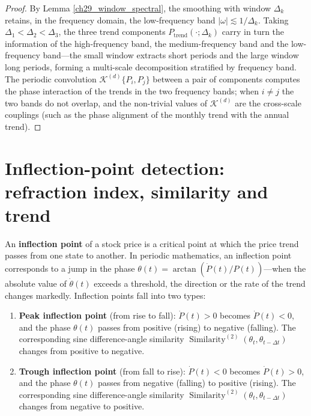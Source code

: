 \begin{proof}
By Lemma \ref{ch29_window_spectral}, the smoothing with window $\Delta_k$ retains, in the frequency domain, the low-frequency band $|\omega| \lesssim 1/\Delta_k$. Taking $\Delta_1 < \Delta_2 < \Delta_3$, the three trend components $P_{\text{trend}}(\cdot;\Delta_k)$ carry in turn the information of the high-frequency band, the medium-frequency band and the low-frequency band---the small window extracts short periods and the large window long periods, forming a multi-scale decomposition stratified by frequency band. The periodic convolution $\mathcal{K}^{(d)}\{P_i, P_j\}$ between a pair of components computes the phase interaction of the trends in the two frequency bands; when $i \neq j$ the two bands do not overlap, and the non-trivial values of $\mathcal{K}^{(d)}$ are the cross-scale couplings (such as the phase alignment of the monthly trend with the annual trend).
\end{proof}

\section{Inflection-point detection: refraction index, similarity and trend}

\begin{definition}\label{def:stock_inflection_point}
An \textbf{inflection point} of a stock price is a critical point at which the price trend passes from one state to another. In periodic mathematics, an inflection point corresponds to a jump in the phase $\theta(t) = \arctan(\dot{P}(t)/P(t))$---when the absolute value of $\dot{\theta}(t)$ exceeds a threshold, the direction or the rate of the trend changes markedly. Inflection points fall into two types:
\begin{enumerate}[label=(\roman*)]
    \item \textbf{Peak inflection point} (from rise to fall): $\dot{P}(t) > 0$ becomes $\dot{P}(t) < 0$, and the phase $\theta(t)$ passes from positive (rising) to negative (falling). The corresponding sine difference-angle similarity $\operatorname{Similarity}^{(2)}(\theta_t, \theta_{t-\Delta t})$ changes from positive to negative.
    \item \textbf{Trough inflection point} (from fall to rise): $\dot{P}(t) < 0$ becomes $\dot{P}(t) > 0$, and the phase $\theta(t)$ passes from negative (falling) to positive (rising). The corresponding sine difference-angle similarity $\operatorname{Similarity}^{(2)}(\theta_t, \theta_{t-\Delta t})$ changes from negative to positive.
\end{enumerate}
\end{definition}

